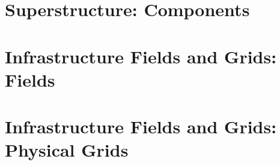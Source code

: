 \documentclass[english]{article}
\newcommand{\shortname}{GR}
\begin{document}
\newpage
\begin{htmlonly}
\end{htmlonly}
\part{Superstructure: Components}
\label{part:Superstructure:_Components}

\setcounter{section}{0}
\renewcommand{\thesection}{\shortname\arabic{section}}
\renewcommand{\thesubsection}{\shortname\arabic{section}.\arabic{subsection}}
\renewcommand{\thesubsubsection}{\shortname\arabic{section}.\arabic{subsection}.\arabic{subsubsection}}



\newpage
\begin{htmlonly}
\end{htmlonly}
\part{Infrastructure Fields and Grids: Fields}

\setcounter{section}{0}
\renewcommand{\thesection}{\shortname\arabic{section}}
\renewcommand{\thesubsection}{\shortname\arabic{section}.\arabic{subsection}}
\renewcommand{\thesubsubsection}{\shortname\arabic{section}.\arabic{subsection}.\arabic{subsubsection}}



\newpage
\begin{htmlonly}
\end{htmlonly}
\part{Infrastructure Fields and Grids: Physical Grids}
\label{part:Infrastructure_Fields_and_Grids:_Physical_Grids}

\setcounter{section}{0}
\renewcommand{\thesection}{\shortname\arabic{section}}
\renewcommand{\thesubsection}{\shortname\arabic{section}.\arabic{subsection}}
\renewcommand{\thesubsubsection}{\shortname\arabic{section}.\arabic{subsection}.\arabic{subsubsection}}



\newpage
\begin{htmlonly}
\end{htmlonly}
\end{document}
